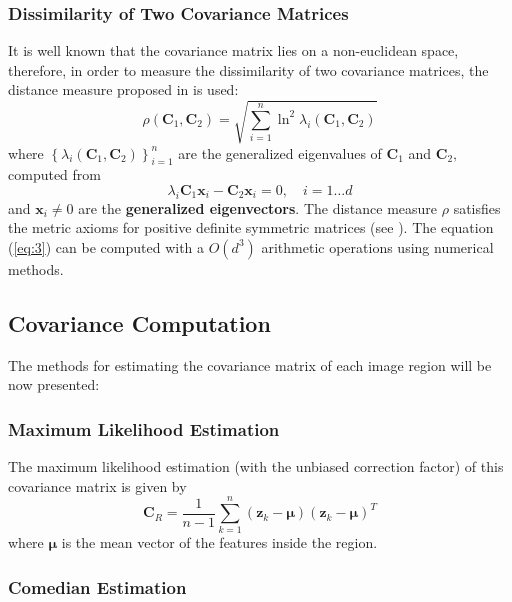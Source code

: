 \documentclass[11pt]{article}
\theoremstyle{definition}
\theoremstyle{remark}
\theoremstyle{remark}
\theoremstyle{remark}
\begin{document}
\subsubsection{Dissimilarity of Two Covariance Matrices} \label{subsub:dis}

It is well known that the covariance matrix lies on a non-euclidean space, therefore, in order to measure the dissimilarity of two covariance matrices, the distance measure proposed in \parencite{forstner2003metric} is used:
%
\begin{equation}\label{eq:3}
\rho\left(\mathbf{C}_{1}, \mathbf{C}_{2}\right)=\sqrt{\sum_{i=1}^{n} \ln ^{2} \lambda_{i}\left(\mathbf{C}_{1}, \mathbf{C}_{2}\right)}
\end{equation}
%
where $\left\{\lambda_{i}\left(\mathbf{C}_{1}, \mathbf{C}_{2}\right)\right\}_{i=1}^n$ are the generalized eigenvalues of $\mathbf{C}_{1}$ and $\mathbf{C}_{2},$ computed from
%
\[
\lambda_{i} \mathbf{C}_{1} \mathbf{x}_{i}-\mathbf{C}_{2} \mathbf{x}_{i}=0, \quad i=1 \ldots d
\]
%
and $\mathbf{x}_{i} \neq 0$ are the \textbf{generalized eigenvectors}. The distance measure $\rho$ satisfies the metric axioms for positive definite symmetric matrices (see \parencite{tuzel2006}). The equation (\ref{eq:3}) can be computed with a $O\left(d^{3}\right)$ arithmetic operations using numerical methods.
\subsection{Covariance Computation}
  
The methods for estimating the covariance matrix of each image region will be now presented:

\subsubsection{Maximum Likelihood Estimation}

The maximum likelihood estimation (with the unbiased correction factor) of this covariance matrix is given by
%
\begin{equation}
\mathbf{C}_{R}=\frac{1}{n-1} \sum_{k=1}^{n}\left(\mathbf{z}_{k}-\boldsymbol{\mu}\right)\left(\mathbf{z}_{k}-\boldsymbol{\mu}\right)^{T}
\end{equation}
%
where $\boldsymbol{\mu}$ is the mean vector of the features inside the region.

\subsubsection{Comedian Estimation}
\end{document}
